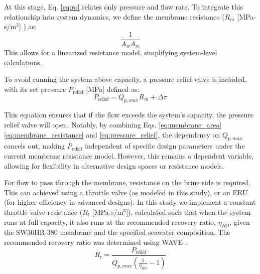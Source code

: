 \documentclass[twocolumn,10pt]{asme2e}
\begin{document}
At this stage, Eq. \ref{eq:ro} relates only pressure and flow rate. To integrate this relationship into system dynamics, we define the membrane resistance ($R_m$ [MPa-s/m$^3$] ) as:
\begin{equation}
    \frac{1}{A_w A_m}
    \label{eq:membrane_resistance}
\end{equation}
\noindent This allows for a linearized resistance model, simplifying system-level calculations.

To avoid running the system above capacity, a pressure relief valve is included, with its set pressure $P_{\text{relief}}$ [MPa] defined as:
\begin{equation}
    P_{\text{relief}} = Q_{p,max}R_m + \Delta \pi
    \label{eq:pressure_relief}
\end{equation}

This equation ensures that if the flow exceeds the system's capacity, the pressure relief valve will open. Notably, by combining Eqs. \ref{eq:membrane_area} \ref{eq:membrane_resistance} and \ref{eq:pressure_relief}, the dependency on $Q_{p,max}$ cancels out, making $P_{\text{relief}}$ independent of specific design parameters under the current membrane resistance model. However, this remains a dependent variable, allowing for flexibility in alternative design spaces or resistance models.

For flow to pass through the membrane, resistance on the brine side is required. This can achieved using a throttle valve (as modeled in this study), or an ERU (for higher efficiency in advanced designs). In this study we implement a constant throttle valve resistance ($R_t$ [MPa-s/m$^3$]), calculated such that when the system runs at full capacity, it also runs at the recommended recovery ratio, $\eta_{RO}$, given the SW30HR-380 membrane and the specified seawater composition. The recommended recovery ratio was determined using WAVE \cite{wave}.
\begin{equation}
    R_t = \frac{P_{\text{relief}}}{Q_{p,max}(\frac{1}{\eta_{RO}} - 1)}
\end{equation}
\end{document}
